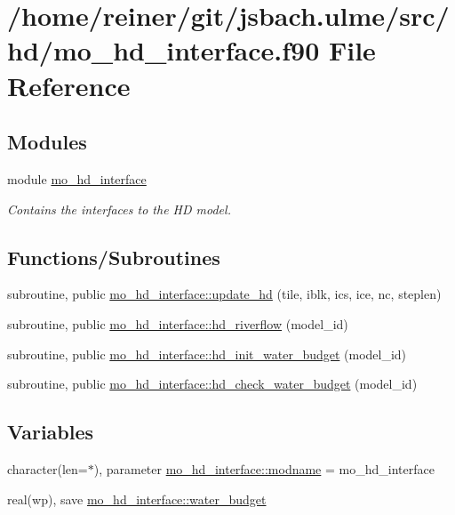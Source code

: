\hypertarget{mo__hd__interface_8f90}{}\section{/home/reiner/git/jsbach.ulme/src/hd/mo\+\_\+hd\+\_\+interface.f90 File Reference}
\label{mo__hd__interface_8f90}
\subsection*{Modules}
\begin{DoxyCompactItemize}
\item 
module \hyperlink{namespacemo__hd__interface}{mo\+\_\+hd\+\_\+interface}
\begin{DoxyCompactList}\small\item\em Contains the interfaces to the H\+D model. \end{DoxyCompactList}\end{DoxyCompactItemize}
\subsection*{Functions/\+Subroutines}
\begin{DoxyCompactItemize}
\item 
subroutine, public \hyperlink{namespacemo__hd__interface_a9c78647e6d4247940081f0f4cb58732c}{mo\+\_\+hd\+\_\+interface\+::update\+\_\+hd} (tile, iblk, ics, ice, nc, steplen)
\item 
subroutine, public \hyperlink{namespacemo__hd__interface_a442c9e62dd9269647a8155a450cedca4}{mo\+\_\+hd\+\_\+interface\+::hd\+\_\+riverflow} (model\+\_\+id)
\item 
subroutine, public \hyperlink{namespacemo__hd__interface_a2ed0f02d21d19a090c35f013754a4a6c}{mo\+\_\+hd\+\_\+interface\+::hd\+\_\+init\+\_\+water\+\_\+budget} (model\+\_\+id)
\item 
subroutine, public \hyperlink{namespacemo__hd__interface_a87e2bf2b3a7f9c37b5a8e75a6e6e1525}{mo\+\_\+hd\+\_\+interface\+::hd\+\_\+check\+\_\+water\+\_\+budget} (model\+\_\+id)
\end{DoxyCompactItemize}
\subsection*{Variables}
\begin{DoxyCompactItemize}
\item 
character(len=$\ast$), parameter \hyperlink{namespacemo__hd__interface_a946d721348db93e22eccc082dff915ce}{mo\+\_\+hd\+\_\+interface\+::modname} = \textquotesingle{}mo\+\_\+hd\+\_\+interface\textquotesingle{}
\item 
real(wp), save \hyperlink{namespacemo__hd__interface_af6eeeb10243506ceeced69bf2bf7835f}{mo\+\_\+hd\+\_\+interface\+::water\+\_\+budget}
\end{DoxyCompactItemize}
